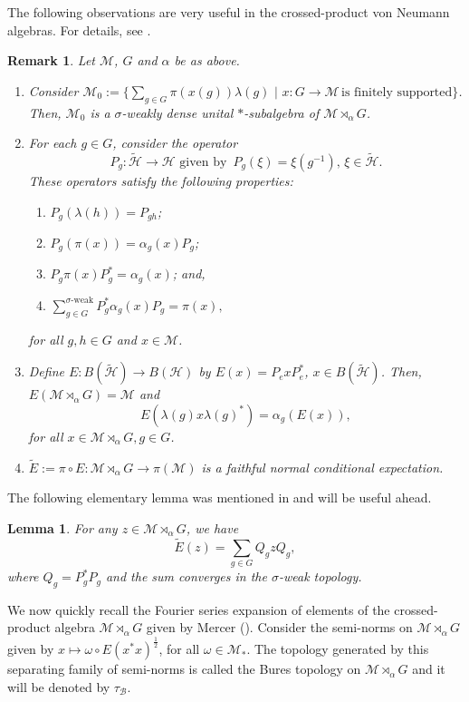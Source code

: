 \documentclass{amsart}
\numberwithin{equation}{section}
\newcommand{\mcal}{\mathcal}
\newcommand{\1}{\mathbf{1}}
\newtheorem{lemma}[theorem]{Lemma}
\newtheorem{remark}[theorem]{Remark}
\begin{document}
The following observations are very useful in the crossed-product von
Neumann algebras. For  details, see   \cite[Page 255]{M}.
\begin{remark}
Let $\mcal{M}$, $G$ and $\alpha$ be as above.
\begin{enumerate}
\item Consider $\mcal{M}_{0}:= \{\sum_{g\in
  G}\pi(x(g))\lambda(g)\,\,|\,\,x: G\rightarrow \mcal{M}\,\text{is
  finitely supported}\}$. Then, $\mcal{M}_{0}$ is a $\sigma$-weakly
  dense unital $*$-subalgebra of $\mcal{M} \rtimes_{\alpha}G$.
\item
  For each $g\in G $, consider the operator 
\[
P_{g}: \mcal{\tilde{H}}\rightarrow \mcal{H}\,\, \text{given by}\,\,\,
P_{g}(\xi)=\xi(g^{-1}),\,\xi\in \mcal{\tilde{H}}.
\]
These operators satisfy the following properties:
\begin{enumerate}
  \item
    $ P_{g}(\lambda(h))= P_{gh}$;
  \item $P_{g}(\pi(x))=\alpha_{g}(x)P_{g}$;
  \item $P_{g}\pi(x)P_{g}^{*}=\alpha_{g}(x)$; and,
    \item $\sum^{\sigma \text{-}\mathrm{weak}}_{g\in
      G} P_{g}^{*}\alpha_{g}(x)P_{g}= \pi (x),$
      \end{enumerate}
for all $g,h\in G$ and $x\in \mcal{M}$.
\item Define $E: B( \mcal{\tilde{H}})\rightarrow B(\mcal{H})$ by $E(x)= P_{e}xP^{*}_{e}$, $x \in B( \mcal{\tilde{H}})$. Then, $E(\mcal{M} \rtimes_{\alpha}G) = \mcal{M}$ and  
$$
E(\lambda(g)x\lambda(g)^*)= \alpha_{g}(E(x)),
$$
for all $x\in \mcal{M} \rtimes_{\alpha}G, g \in G$. 
\item[(iv)] $\tilde{E}:= \pi \circ E : \mcal{M} \rtimes_{\alpha}G
  \rightarrow \pi(\mcal{M})$ is a faithful normal conditional
  expectation.
\end{enumerate}
\end{remark}
The following elementary lemma was mentioned in \cite{M} and will be useful ahead.
\begin{lemma}\label{relation}
For any $z\in \mcal{M} \rtimes_{\alpha}G$, we have
\[
\tilde{E}(z)= \sum_{g\in G}Q_{g}zQ_{g},
\]
where $Q_{g}= P^{*}_{g}P_{g}$ and the sum converges in the $\sigma$-weak topology. 
\end{lemma}

We now quickly recall the Fourier series expansion of elements of the
crossed-product algebra $\mcal{M}\rtimes_{\alpha}G$ given by
Mercer (\cite{M}). Consider the semi-norms on $\mcal{M}\rtimes_{\alpha}G$ given
by $x\mapsto \omega\circ E(x^*x)^\frac{1}{2}$, for all $\omega \in
\mcal{M}_{*}$. The topology generated by this separating family of
semi-norms is called the Bures topology on $\mcal{M}\rtimes_{\alpha}G$
and it will be denoted by $\tau_{\mathcal{B}}$.
\end{document}

